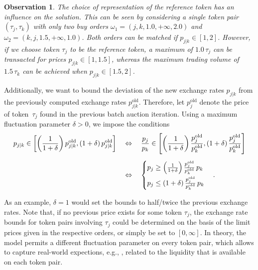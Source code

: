 \documentclass[11pt,parskip=full]{scrartcl}%
\newcommand*{\eg}{e.g., }
\newtheorem{observation}[theorem]{Observation}
\begin{document}

\vspace{.2cm}
\begin{observation}
The choice of representation of the reference token has an influence on the solution.
This can be seen by considering a single token pair $ (\tau_j,\tau_k) $ with only two buy orders
$ \omega_1 = (j,k,1.0,+\infty,2.0) $ and $ \omega_2 = (k,j,1.5,+\infty,1.0) $.
Both orders can be matched if $ p_{j|k} \in [1,2] $.
However, if we choose token $ \tau_j $ to be the reference token, a maximum of $ 1.0 \, \tau_j $
can be transacted for prices $ p_{j|k} \in [1,1.5] $, whereas the maximum trading volume of
$ 1.5 \, \tau_k $ can be achieved when $ p_{j|k} \in [1.5,2] $.
\end{observation}

Additionally, we want to bound the deviation of the new exchange rates $ p_{j|k} $ from the
previously computed exchange rates $ p_{j|k}^\mathrm{old} $.
Therefore, let $ p^\mathrm{old}_j $ denote the price of token~$ \tau_j $ found in the previous
batch auction iteration.
Using a maximum fluctuation parameter $ \delta > 0 $, we impose the conditions
\begin{align}
  p_{j|k} \in
  \left[
    \left(\frac{1}{1+\delta}\right) p^\mathrm{old}_{j|k},
    (1+\delta) \, p^\mathrm{old}_{j|k}
  \right]
  \quad &\Leftrightarrow \quad
  \frac{p_j}{p_k} \in
  \left[
    \left(\frac{1}{1+\delta}\right) \frac{p^\mathrm{old}_j}{p^\mathrm{old}_k},
    (1+\delta) \, \frac{p^\mathrm{old}_j}{p^\mathrm{old}_k}
  \right]\notag\\[2mm]
  \quad &\Leftrightarrow \quad
  \begin{cases}
    p_j \ge \left(\frac{1}{1+\delta}\right) \frac{p^\mathrm{old}_j}{p^\mathrm{old}_k} \, p_k
    \\[2mm]
    p_j \le \left(1+\delta\right) \frac{p^\mathrm{old}_j}{p^\mathrm{old}_k} \, p_k
  \end{cases}.
  \label{eq:bounds_xrates}
\end{align}

As an example, $ \delta = 1 $ would set the bounds to half/twice the previous exchange rates.
Note that, if no previous price exists for some token $ \tau_j $, the exchange rate bounds for
token pairs involving $ \tau_j $ could be determined on the basis of the limit prices given in
the respective orders, or simply be set to $ [0,\infty] $.
In theory, the model permits a different fluctuation parameter on every token pair, which allows to
capture real-world expections, \eg, related to the liquidity that is available on each token pair. 
\end{document}
